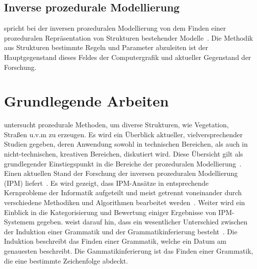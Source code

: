 \subsection*{Inverse prozedurale Modellierung}
\citeauthor{aliaga_2016} spricht bei der inversen prozeduralen Modellierung von dem Finden einer prozeduralen Repräsentation
von Strukturen bestehender Modelle~\cite{aliaga_2016}.
Die Methodik aus Strukturen bestimmte Regeln und Parameter abzuleiten ist der Hauptgegenstand dieses Feldes der
Computergrafik und aktueller Gegenstand der Forschung.

\section{Grundlegende Arbeiten}

\citeauthor{smelik_2014} untersucht prozedurale Methoden, um diverse Strukturen, wie Vegetation, Straßen u.v.m zu erzeugen.
Es wird ein Überblick aktueller, vielversprechender Studien gegeben, deren Anwendung sowohl in technischen Bereichen,
als auch in nicht-technischen, kreativen Bereichen, diskutiert wird.
Diese Übersicht gilt als grundlegender Einstiegspunkt in die Bereiche der prozeduralen
Modellierung~\cite{smelik_2014}.
Einen aktuellen Stand der Forschung der inversen prozeduralen Modellierung (IPM) liefert~\citeauthor{aliaga_2016}.
Es wird gezeigt, dass IPM-Ansätze in entsprechende Kernprobleme der Informatik aufgeteilt und meist getrennt voneinander durch
verschiedene Methodiken und Algorithmen bearbeitet werden~\cite{aliaga_2016}.
Weiter wird ein Einblick in die Kategorisierung und Bewertung einiger Ergebnisse von IPM-Systemem gegeben.
\citeauthor{higuera_2010} weist darauf hin, dass ein wesentlicher Unterschied zwischen der Induktion einer Grammatik
und der Grammatikinferierung besteht~\cite{higuera_2010}.
Die Induktion beschreibt das Finden einer Grammatik, welche ein Datum am genauesten beschreibt.
Die Gammatikinferierung ist das Finden einer Grammatik, die eine bestimmte Zeichenfolge abdeckt.

\newpage

